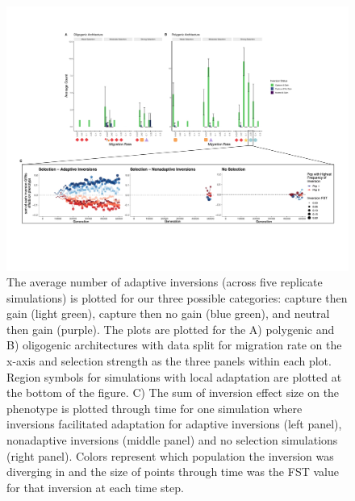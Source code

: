 \documentclass[10pt, scrartlc]{article}
\begin{document}
\begin{figure}[h]
	\begin{center}
		\includegraphics[width = 6.5 in]{Fig4_evoHist.pdf}
	\end{center}
	\caption[Evolutionary History of Adaptive Inversions]{The average number of adaptive inversions (across five replicate simulations) is plotted for our three possible categories: capture then gain (light green), capture then no gain (blue green), and neutral then gain (purple). The plots are plotted for the A) polygenic and B) oligogenic architectures with data split for migration rate on the x-axis and selection strength as the three panels within each plot. Region symbols for simulations with local adaptation are plotted at the bottom of the figure. C) The sum of inversion effect size on the phenotype is plotted through time for one simulation where inversions facilitated adaptation for adaptive inversions (left panel), nonadaptive inversions (middle panel) and no selection simulations (right panel). Colors represent which population the inversion was diverging in and the size of points through time was the FST value for that inversion at each time step.}
\end{figure}
\end{document}
